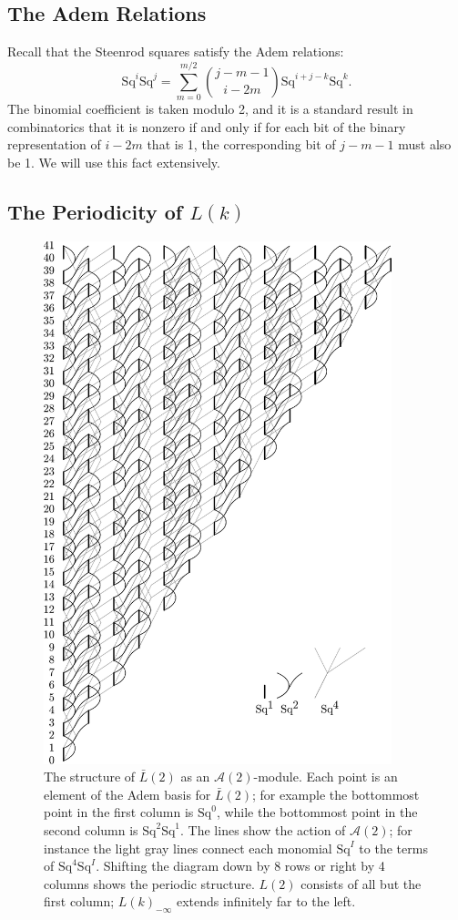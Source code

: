 \documentclass{article}
\newcommand{\A}{\mathcal{A}}
\newcommand{\Sq}{\mathrm{Sq}}
\renewcommand{\L}{\bar{L}}
\newcommand{\Lkm}[1][k]{L{(#1)}_{-\infty}}
\begin{document}
\subsection{The Adem Relations}

Recall that the Steenrod squares satisfy the Adem relations:
\[ \Sq^i\Sq^j = \sum_{m=0}^{m/2}\binom{j-m-1}{i-2m}\Sq^{i+j-k}\Sq^k.\]
The binomial coefficient is taken modulo 2, and it is a standard result in combinatorics that it is nonzero if and only if for each bit of the binary representation of $i-2m$ that is 1, the corresponding bit of $j-m-1$ must also be 1.  We will use this fact extensively.

\subsection{The Periodicity of \boldmath$L(k)$}

\begin{figure}
  \includegraphics[width=0.9\textwidth]{pics/L2-paper.pdf}
  \caption{The structure of $\L(2)$ as an $\A(2)$-module.  Each point is an element of the Adem basis for $\L(2)$; for example the bottommost point in the first column is $\Sq^0$, while the bottommost point in the second column is $\Sq^2\Sq^1$.  The lines show the action of $\A(2)$; for instance the light gray lines connect each monomial $\Sq^I$ to the terms of $\Sq^4\Sq^I$.  Shifting the diagram down by 8 rows or right by 4 columns shows the periodic structure.  $L(2)$ consists of all but the first column; $\Lkm$ extends infinitely far to the left.\label{fig:L2}}
\end{figure}
\end{document}
